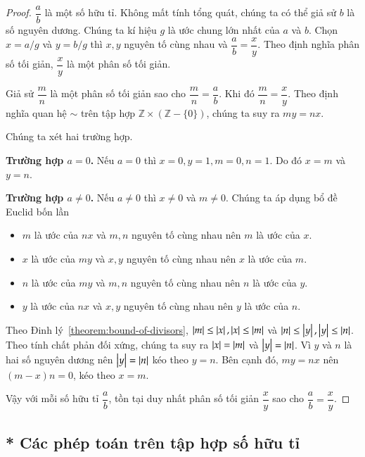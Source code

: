 \begin{proof}
    $\dfrac{a}{b}$ là một số hữu tỉ. Không mất tính tổng quát, chúng ta có thể giả sử $b$ là số nguyên dương. Chúng ta kí hiệu $g$ là ước chung lớn nhất của $a$ và $b$. Chọn $x = a/g$ và $y = b/g$ thì $x, y$ nguyên tố cùng nhau và $\dfrac{a}{b} = \dfrac{x}{y}$. Theo định nghĩa phân số tối giản, $\dfrac{x}{y}$ là một phân số tối giản.

    Giả sử $\dfrac{m}{n}$ là một phân số tối giản sao cho $\dfrac{m}{n} = \dfrac{a}{b}$. Khi đó $\dfrac{m}{n} = \dfrac{x}{y}$. Theo định nghĩa quan hệ $\sim$ trên tập hợp $\mathbb{Z}\times (\mathbb{Z} - \{0\})$, chúng ta suy ra $m y = n x$.

    Chúng ta xét hai trường hợp.

    \textbf{Trường hợp $a = 0$.} Nếu $a = 0$ thì $x = 0, y = 1, m = 0, n = 1$. Do đó $x = m$ và $y = n$.

    \textbf{Trường hợp $a\ne 0$.} Nếu $a\ne 0$ thì $x\ne 0$ và $m\ne 0$. Chúng ta áp dụng bổ đề Euclid bốn lần
    \begin{itemize}
        \item $m$ là ước của $n x$ và $m, n$ nguyên tố cùng nhau nên $m$ là ước của $x$.
        \item $x$ là ước của $m y$ và $x, y$ nguyên tố cùng nhau nên $x$ là ước của $m$.
        \item $n$ là ước của $m y$ và $m, n$ nguyên tố cùng nhau nên $n$ là ước của $y$.
        \item $y$ là ước của $n x$ và $x, y$ nguyên tố cùng nhau nên $y$ là ước của $n$.
    \end{itemize}

    Theo Đinh lý~\ref{theorem:bound-of-divisors}, $\left\vert{m}\right\vert \leq \left\vert{x}\right\vert, \left\vert{x}\right\vert \leq \left\vert{m}\right\vert$ và $\left\vert{n}\right\vert \leq \left\vert{y}\right\vert, \left\vert{y}\right\vert \leq \left\vert{n}\right\vert$. Theo tính chất phản đối xứng, chúng ta suy ra $\left\vert{x}\right\vert = \left\vert{m}\right\vert$ và $\left\vert{y}\right\vert = \left\vert{n}\right\vert$. Vì $y$ và $n$ là hai số nguyên dương nên $\left\vert{y}\right\vert = \left\vert{n}\right\vert$ kéo theo $y = n$. Bên cạnh đó, $m y = n x$ nên $(m - x) n = 0$, kéo theo $x = m$.

    Vậy với mỗi số hữu tỉ $\dfrac{a}{b}$, tồn tại duy nhất phân số tối giản $\dfrac{x}{y}$ sao cho $\dfrac{a}{b} = \dfrac{x}{y}$.
\end{proof}

\subsection{* Các phép toán trên tập hợp số hữu tỉ}

